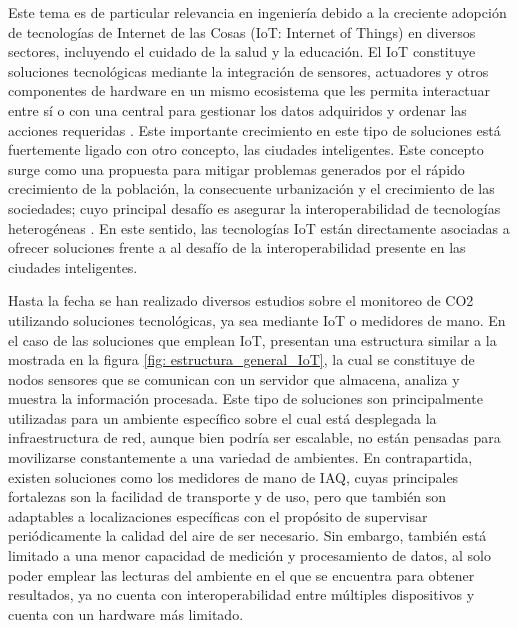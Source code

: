Este tema es de particular relevancia en ingeniería debido a la creciente adopción de tecnologías de Internet de las Cosas (IoT: Internet of Things) en diversos sectores, incluyendo el cuidado de la salud y la educación. El IoT constituye soluciones tecnológicas mediante la integración de sensores, actuadores y otros componentes de hardware en un mismo ecosistema que les permita interactuar entre sí o con una central para gestionar los datos adquiridos y ordenar las acciones requeridas \cite{the_application_of_internet_of_things_in_healthcare_a_systematic_literature_review_and_classification}. Este importante crecimiento en este tipo de soluciones está fuertemente ligado con otro concepto, las ciudades inteligentes. Este concepto surge como una propuesta para mitigar problemas generados por el rápido crecimiento de la población, la consecuente urbanización y el crecimiento de las sociedades; cuyo principal desafío es asegurar la interoperabilidad de tecnologías heterogéneas \cite{indoor_air_quality_assessment_using_a_co2_monitoring_system_based_on_internet_of_things}. En este sentido, las tecnologías IoT están directamente asociadas a ofrecer soluciones frente a al desafío de la interoperabilidad presente en las ciudades inteligentes.

Hasta la fecha se han realizado diversos estudios sobre el monitoreo de CO2 utilizando soluciones tecnológicas, ya sea mediante IoT o medidores de mano. En el caso de las soluciones que emplean IoT, presentan una estructura similar a la mostrada en la figura \ref{fig: estructura_general_IoT}, la cual se constituye de nodos sensores que se comunican con un servidor que almacena, analiza y muestra la información procesada. Este tipo de soluciones son principalmente utilizadas para un ambiente específico sobre el cual está desplegada la infraestructura de red, aunque bien podría ser escalable, no están pensadas para movilizarse constantemente a una variedad de ambientes. En contrapartida, existen soluciones como los medidores de mano de IAQ, cuyas principales fortalezas son la facilidad de transporte y de uso, pero que también son adaptables a localizaciones específicas con el propósito de supervisar periódicamente la calidad del aire de ser necesario. Sin embargo, también está limitado a una menor capacidad de medición y procesamiento de datos, al solo poder emplear las lecturas del ambiente en el que se encuentra para obtener resultados, ya no cuenta con interoperabilidad entre múltiples dispositivos y cuenta con un hardware más limitado. 


